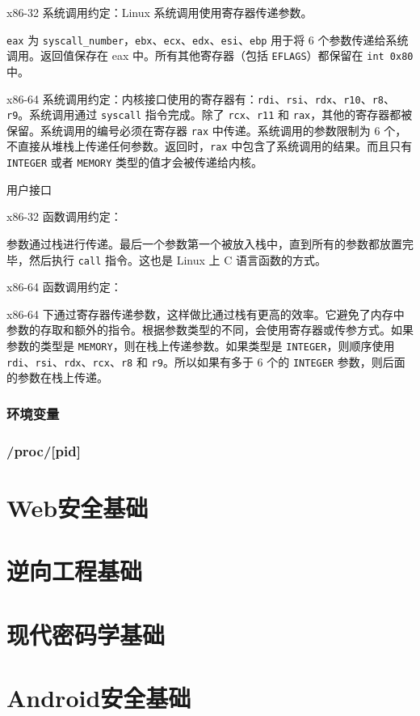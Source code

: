 \indent x86-32 系统调用约定：Linux 系统调用使用寄存器传递参数。

\indent \verb+eax+ 为 \verb+syscall_number+，\verb+ebx+、\verb+ecx+、\verb+edx+、\verb+esi+、\verb+ebp+ 用于将 6 个参数传递给系统调用。返回值保存在 eax 中。所有其他寄存器（包括 \verb+EFLAGS+）都保留在 \verb+int 0x80+ 中。

\indent x86-64 系统调用约定：内核接口使用的寄存器有：\verb+rdi+、\verb+rsi+、\verb+rdx+、\verb+r10+、\verb+r8+、\verb+r9+。系统调用通过 \verb+syscall+ 指令完成。除了 \verb+rcx+、\verb+r11+ 和 \verb+rax+，其他的寄存器都被保留。系统调用的编号必须在寄存器 \verb+rax+ 中传递。系统调用的参数限制为 6 个，不直接从堆栈上传递任何参数。返回时，\verb+rax+ 中包含了系统调用的结果。而且只有 \verb+INTEGER+ 或者 \verb+MEMORY+ 类型的值才会被传递给内核。

\indent 用户接口

\indent x86-32 函数调用约定：

\indent 参数通过栈进行传递。最后一个参数第一个被放入栈中，直到所有的参数都放置完毕，然后执行 \verb+call+ 指令。这也是 Linux 上 C 语言函数的方式。

\indent x86-64 函数调用约定：

\indent x86-64 下通过寄存器传递参数，这样做比通过栈有更高的效率。它避免了内存中参数的存取和额外的指令。根据参数类型的不同，会使用寄存器或传参方式。如果参数的类型是 \verb+MEMORY+，则在栈上传递参数。如果类型是 \verb+INTEGER+，则顺序使用 \verb+rdi+、\verb+rsi+、\verb+rdx+、\verb+rcx+、\verb+r8+ 和 \verb+r9+。所以如果有多于 6 个的 \verb+INTEGER+ 参数，则后面的参数在栈上传递。

\subsubsection{环境变量}
\indent \setlength{\parindent}{2em}

\subsubsection{/proc/[pid]}
\indent \setlength{\parindent}{2em}

\section{Web安全基础}
\indent \setlength{\parindent}{2em}

\section{逆向工程基础}
\indent \setlength{\parindent}{2em}

\section{现代密码学基础}
\indent \setlength{\parindent}{2em}

\section{Android安全基础}
\indent \setlength{\parindent}{2em}
